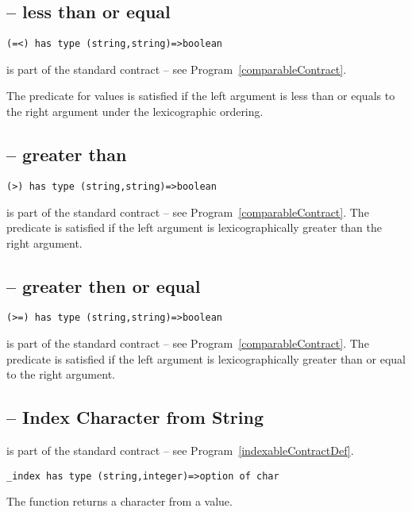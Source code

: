 \subsection{\q{=<} -- less than or equal}
\begin{lstlisting}
(=<) has type (string,string)=>boolean
\end{lstlisting}
\q{(=<)} is part of the standard  contract -- see Program~\vref{comparableContract}.

The \q{=<} predicate for  values is satisfied if the left argument is less than or equals to the right argument under the lexicographic ordering.

\subsection{\q{>} -- greater than}
\begin{lstlisting}
(>) has type (string,string)=>boolean
\end{lstlisting}
\q{(>)} is part of the standard  contract -- see Program~\vref{comparableContract}.
The \q{>} predicate is satisfied if the left argument is lexicographically greater than the right argument.

\subsection{\q{>=} -- greater then or equal}
\begin{lstlisting}
(>=) has type (string,string)=>boolean
\end{lstlisting}
\q{(>=)} is part of the standard  contract -- see Program~\vref{comparableContract}.
The \q{>=} predicate is satisfied if the left argument is lexicographically greater than or equal to the right argument.

\subsection{ -- Index Character from String}
\label{indexString}
 is part of the standard  contract -- see Program~\vref{indexableContractDef}.
\begin{lstlisting}
_index has type (string,integer)=>option of char
\end{lstlisting}
The  function returns a character from a  value.

